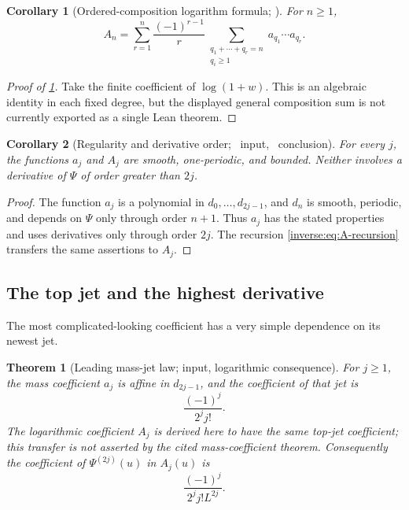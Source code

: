 \documentclass[11pt,oneside]{article}
\newtheorem{theorem}{Theorem}[section]
\newtheorem{corollary}[corollary]{Corollary}
\theoremstyle{definition}
\theoremstyle{remark}
\begin{document}
\begin{corollary}[Ordered-composition logarithm formula; \Derived]
\label{inverse:cor:log-composition}
For \(n\geq1\),
\begin{equation}
 A_n
 =\sum_{r=1}^n\frac{(-1)^{r-1}}r
   \sum_{\substack{q_1+\cdots+q_r=n\\q_i\geq1}}
   a_{q_1}\cdots a_{q_r}. \label{inverse:eq:A-compositions}
\end{equation}
\end{corollary}

\begin{proof}[Proof of \cref{inverse:cor:log-composition}]
Take the finite coefficient of \(\log(1+w)\).  This is an algebraic identity in each fixed
degree, but the displayed general composition sum is not currently exported as a single
Lean theorem.
\end{proof}

\begin{corollary}[Regularity and derivative order; \Formalized\ input,
\Derived\ conclusion]
\label{inverse:cor:A-structure}
For every $j$, the functions $a_j$ and $A_j$ are smooth, one-periodic,
and bounded.  Neither involves a derivative of $\Psi$ of order greater
than $2j$.
\end{corollary}

\begin{proof}
The function $a_j$ is a polynomial in
$d_0,\dots,d_{2j-1}$, and $d_n$ is smooth, periodic, and depends on
$\Psi$ only through order $n+1$.  Thus $a_j$ has the stated properties
and uses derivatives only through order $2j$.  The recursion
\eqref{inverse:eq:A-recursion} transfers the same assertions to $A_j$.
\end{proof}

\subsection{The top jet and the highest derivative}

The most complicated-looking coefficient has a very simple dependence on
its newest jet.

\begin{theorem}[Leading mass-jet law; \Formalized{} input, \Derived{} logarithmic consequence]
\label{inverse:thm:top-jet}
For $j\geq1$, the mass coefficient $a_j$ is affine in $d_{2j-1}$, and
the coefficient of that jet is
\begin{equation}
 \frac{(-1)^j}{2^j j!}. \label{inverse:eq:top-jet-coefficient}
\end{equation}
The logarithmic coefficient $A_j$ is derived here to have the same top-jet coefficient; this transfer is not asserted by the cited mass-coefficient theorem.
Consequently the coefficient of $\Psi^{(2j)}(u)$ in $A_j(u)$ is
\begin{equation}
 \boxed{\frac{(-1)^j}{2^j j!L^{2j}}.}
 \label{inverse:eq:highest-derivative}
\end{equation}
\end{theorem}
\end{document}
